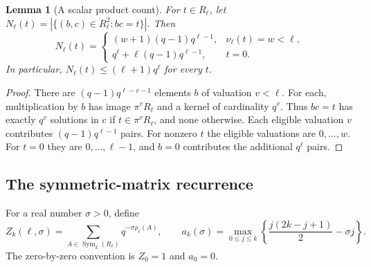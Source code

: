 \documentclass[11pt]{article}
\numberwithin{equation}{section}
\newtheorem{lemma}[theorem]{Lemma}
\theoremstyle{remark}
\newcommand{\Sym}{\operatorname{Sym}}
\begin{document}
\begin{lemma}[A scalar product count]\label{lem:products}
For $t\in R_\ell$, let
$N_\ell(t)=|\{(b,c)\in R_\ell^2:bc=t\}|$. Then
\begin{equation}\label{eq:productcount}
 N_\ell(t)=
 \begin{cases}
  (w+1)(q-1)q^{\ell-1},&\nu_\ell(t)=w<\ell,\\
  q^\ell+\ell(q-1)q^{\ell-1},&t=0.
 \end{cases}
\end{equation}
In particular, $N_\ell(t)\le(\ell+1)q^\ell$ for every $t$.
\end{lemma}
\begin{proof}
There are $(q-1)q^{\ell-v-1}$ elements $b$ of valuation $v<\ell$.
For each, multiplication by $b$ has image $\pi^vR_\ell$ and a
kernel of cardinality $q^v$. Thus $bc=t$ has exactly $q^v$
solutions in $c$ if $t\in\pi^vR_\ell$, and none otherwise.
Each eligible valuation $v$ contributes $(q-1)q^{\ell-1}$ pairs.
For nonzero $t$ the eligible valuations are $0,\ldots,w$.
For $t=0$ they are $0,\ldots,\ell-1$, and $b=0$ contributes
the additional $q^\ell$ pairs.
\end{proof}

\subsection{The symmetric-matrix recurrence}
For a real number $\sigma >0$, define
\[
 Z_k(\ell,\sigma )=\sum_{A\in\Sym_k(R_\ell)}q^{-\sigma \rho_\ell(A)},\qquad
 a_k(\sigma )=\max_{0\le j\le k}
          \left\{\frac{j(2k-j+1)}2-\sigma j\right\}.
\]
The zero-by-zero convention is $Z_0=1$ and $a_0=0$.
\end{document}
